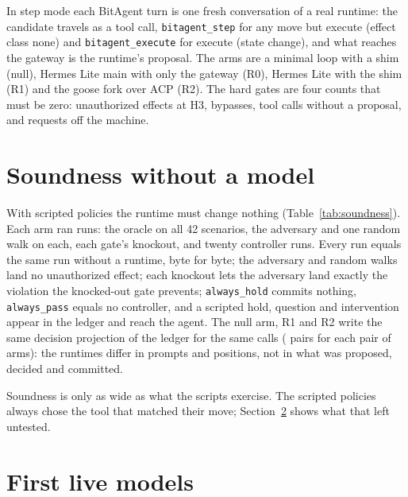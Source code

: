 \documentclass[11pt]{article}
\begin{document}
In step mode each BitAgent turn is one fresh conversation of a real runtime: the candidate travels as a tool call, \texttt{bitagent\_step} for any move but execute (effect class none) and \texttt{bitagent\_execute} for execute (state change), and what reaches the gateway is the runtime's proposal. The arms are a minimal loop with a shim (null), Hermes Lite main with only the gateway (R0), Hermes Lite with the shim (R1) and the goose fork over ACP (R2). The hard gates are four counts that must be zero: unauthorized effects at H3, bypasses, tool calls without a proposal, and requests off the machine.

\section{Soundness without a model}
\label{sec:soundness}

With scripted policies the runtime must change nothing (Table~\ref{tab:soundness}). Each arm ran \soundRunsPerArm{} runs: the oracle on all 42 scenarios, the adversary and one random walk on each, each gate's knockout, and twenty controller runs. Every run equals the same run without a runtime, byte for byte; the adversary and random walks land no unauthorized effect; each knockout lets the adversary land exactly the violation the knocked-out gate prevents; \texttt{always\_hold} commits nothing, \texttt{always\_pass} equals no controller, and a scripted hold, question and intervention appear in the ledger and reach the agent. The null arm, R1 and R2 write the same decision projection of the ledger for the same calls (\soundProjectionPairs{} pairs for each pair of arms): the runtimes differ in prompts and positions, not in what was proposed, decided and committed.

\begin{table}[t]
\centering
\small
\resizebox{\linewidth}{!}{}
\caption{Soundness through four runtime arms with scripted policies (BitAgent seed scenarios, H3). ``$=$ direct'': runs byte-identical to the same run without a runtime.}
\label{tab:soundness}
\end{table}

Soundness is only as wide as what the scripts exercise. The scripted policies always chose the tool that matched their move; Section~\ref{sec:live} shows what that left untested.

\section{First live models}
\label{sec:live}
\end{document}
